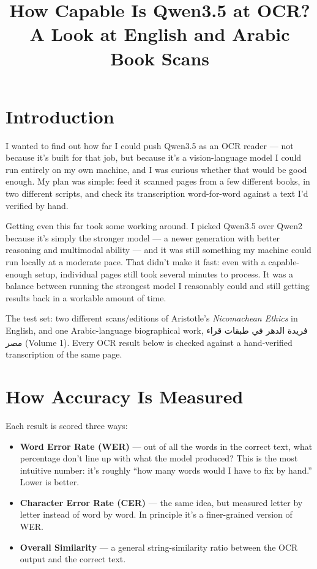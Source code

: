 \documentclass[11pt]{article}
\title{How Capable Is Qwen3.5 at OCR?\\
\large A Look at English and Arabic Book Scans}
\author{}
\date{}
\begin{document}
\maketitle

\section{Introduction}

I wanted to find out how far I could push Qwen3.5 as an OCR reader --- not because it's
built for that job, but because it's a vision-language model I could run entirely on my own
machine, and I was curious whether that would be good enough. My plan was simple: feed it
scanned pages from a few different books, in two different scripts, and check its
transcription word-for-word against a text I'd verified by hand.

Getting even this far took some working around. I picked Qwen3.5 over Qwen2 because it's
simply the stronger model --- a newer generation with better reasoning and multimodal
ability --- and it was still something my machine could run locally at a moderate pace.
That didn't make it fast: even with a capable-enough setup, individual pages still took
several minutes to process. It was a balance between running the strongest model I
reasonably could and still getting results back in a workable amount of time.

The test set: two different scans/editions of Aristotle's \emph{Nicomachean Ethics} in
English, and one Arabic-language biographical work,
\textarabic{فريدة الدهر في طبقات قراء مصر} (Volume 1). Every OCR result below is checked
against a hand-verified transcription of the same page.

\section{How Accuracy Is Measured}

Each result is scored three ways:

\begin{itemize}
    \item \textbf{Word Error Rate (WER)} --- out of all the words in the correct text, what
        percentage don't line up with what the model produced? This is the most intuitive
        number: it's roughly ``how many words would I have to fix by hand.'' Lower is
        better.
    \item \textbf{Character Error Rate (CER)} --- the same idea, but measured letter by
        letter instead of word by word. In principle it's a finer-grained version of WER.
    \item \textbf{Overall Similarity} --- a general string-similarity ratio between the OCR
        output and the correct text.
\end{itemize}
\end{document}
